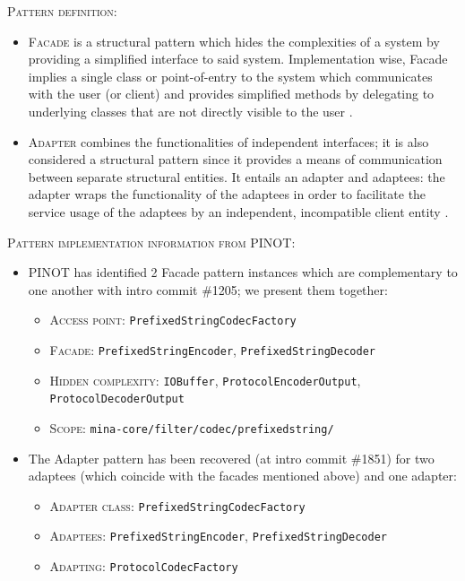 \textsc{Pattern definition}: 
\begin{itemize}
    \item \textsc{Facade} is a structural pattern which hides the complexities of a system by providing a simplified interface to said system. Implementation wise, Facade implies a single class or point-of-entry to the system which communicates with the user (or client) and provides simplified methods by delegating to underlying classes that are not directly visible to the user \cite{facade}\cite{facade1}.
    \item \textsc{Adapter} combines the functionalities of independent interfaces; it is also considered a structural pattern since it provides a means of communication between separate structural entities. It entails an adapter and adaptees: the adapter wraps the functionality of the adaptees in order to facilitate the service usage of the adaptees by an independent, incompatible client entity \cite{adapter}\cite{adapter1}.
\end{itemize}

\textsc{Pattern implementation information from PINOT}: 
\begin{itemize}
    \item PINOT has identified 2 Facade pattern instances which are complementary to one another with intro commit \#1205; we present them together:
        \begin{itemize}
            \item \textsc{Access point}: \texttt{PrefixedStringCodecFactory}
            \item \textsc{Facade}: \texttt{PrefixedStringEncoder}, \texttt{PrefixedStringDecoder}
            \item \textsc{Hidden complexity}: \texttt{IOBuffer}, \texttt{ProtocolEncoderOutput}, \texttt{ProtocolDecoderOutput}
            \item \textsc{Scope}: \texttt{mina-core/filter/codec/prefixedstring/}
        \end{itemize}
    \item The Adapter pattern has been recovered (at intro commit \#1851) for two adaptees (which coincide with the facades mentioned above) and one adapter:
        \begin{itemize}
            \item \textsc{Adapter class}: \texttt{PrefixedStringCodecFactory}
            \item \textsc{Adaptees}: \texttt{PrefixedStringEncoder}, \texttt{PrefixedStringDecoder}
            \item \textsc{Adapting}: \texttt{ProtocolCodecFactory}
        \end{itemize}
\end{itemize}

